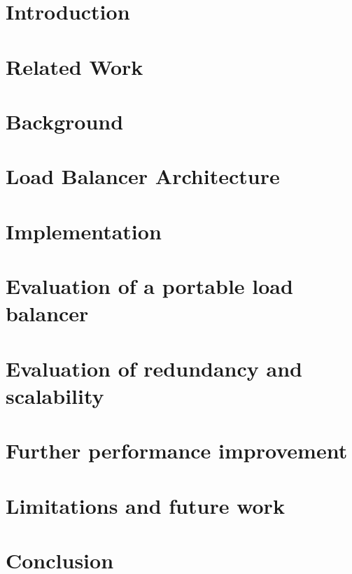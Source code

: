 
\graphicspath{{Manuscript/}}

\chapter{Introduction}\label{chapter:introduction}


\chapter{Related Work}\label{chapter:related}


\chapter{Background}\label{chapter:background}


\chapter{Load Balancer Architecture}\label{chapter:architecture}


\chapter{Implementation}\label{chapter:implemetation}


\chapter{Evaluation of a portable load balancer}\label{chapter:portablelb}


\chapter{Evaluation of redundancy and scalability}\label{chapter:redundancy}


\chapter{Further performance improvement}\label{chapter:performance}


\chapter{Limitations and future work}\label{chapter:futurework}


\chapter{Conclusion}\label{chapter:conclusion}

%


